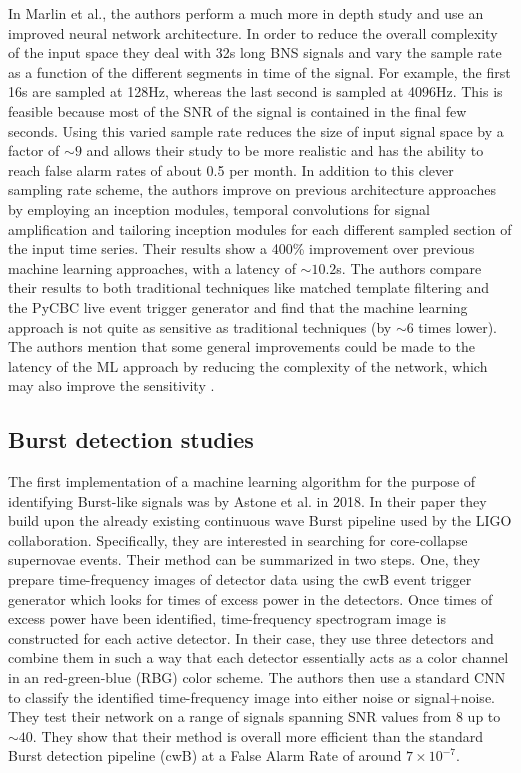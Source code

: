 In Marlin et al., the authors perform a much more in depth study and use an improved neural network architecture. In order to reduce the overall complexity of the input space they deal with 32s long \ac{BNS} signals and vary the sample rate as a function of the different segments in time of the signal. For example, the first 16s are sampled at 128Hz, whereas the last second is sampled at 4096Hz. This is feasible because most of the \ac{SNR} of the signal is contained in the final few seconds. Using this varied sample rate reduces the size of input signal space by a factor of $\sim 9$ and allows their study to be more realistic and has the ability to reach false alarm rates of about 0.5 per month. In addition to this clever sampling rate scheme, the authors improve on previous architecture approaches by employing an inception modules, temporal convolutions for signal amplification and tailoring inception modules for each different sampled section of the input time series. Their results show a 400\% improvement over previous machine learning approaches, with a latency of $\sim10.2$s. The authors compare their results to both traditional techniques like matched template filtering and the PyCBC live event trigger generator and find that the machine learning approach is not quite as sensitive as traditional techniques (by $\sim 6$ times lower). The authors mention that some general improvements could be made to the latency of the \ac{ML} approach by reducing the complexity of the network, which may also improve the sensitivity \cite{PhysRevD.102.063015}.

%
%
\subsection{Burst detection studies}

%

The first implementation of a machine learning algorithm for the purpose of identifying Burst-like signals was by Astone et al. in 2018. In their paper they build upon the already existing continuous wave Burst pipeline used by the \ac{LIGO} collaboration. Specifically, they are interested in searching for core-collapse supernovae events. Their method can be summarized in two steps. One, they prepare time-frequency images of detector data using the cwB event trigger generator which looks for times of excess power in the detectors. Once times of excess power have been identified, time-frequency spectrogram image is constructed for each active detector. In their case, they use three detectors and combine them in such a way that each detector essentially acts as a color channel in an red-green-blue (RBG) color scheme. The authors then use a standard \ac{CNN} to classify the identified time-frequency image into either noise or signal+noise. They test their network on a range of signals spanning \ac{SNR} values from 8 up to $\sim 40$. They show that their method is overall more efficient than the standard Burst detection pipeline (cwB) at a False Alarm Rate of around $7 \times 10^{-7}$. 


